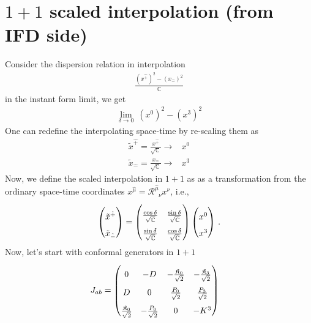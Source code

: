 \documentclass[]{article}
\numberwithin{equation}{section}
\begin{document}
{{\section{$1+1$ scaled interpolation (from IFD side)}\label{scaled_interpol_from_IFD}
Consider the dispersion relation in interpolation
\begin{align}
    \frac{(x^{\hat{+}})^{2}-(x_{\hat{-}})^{2}}{\mathbb{C}}
\end{align}
in the instant form limit, we get
\begin{align}
    \lim_{\delta\longrightarrow0}~(x^0)^2-(x^3)^2
\end{align}
One can redefine the interpolating space-time by re-scaling them as
\begin{align}
    \tilde{x}^{\hat{+}}=\frac{x^{\hat{+}}}{\sqrt{\mathbb{C}}}\longrightarrow &x^0\\
    \tilde{x}_{\hat{-}}=\frac{x_{\hat{-}}}{\sqrt{\mathbb{C}}}\longrightarrow &x^3
\end{align}
Now, we define the scaled interpolation in $1+1$ as as a transformation from the ordinary space-time coordinates $x^{\hat{\mu}}=\mathcal{R}^{\hat{\mu}}_{\phantom{\mu}{\nu}}x^{\nu}$, i.e.,
\begin{align}
  \begin{pmatrix}
   \rule{0pt}{16pt} \tilde{x}^{\hat{+}}\\
    \rule{0pt}{16pt} \tilde{x}_{\hat{-}}
  \end{pmatrix}=
  \begin{pmatrix}
    \rule{0pt}{16pt} \frac{\cos\delta}{\sqrt{\mathbb{C}}}  & \frac{\sin\delta}{\sqrt{\mathbb{C}}} \\
    \rule{0pt}{16pt} \frac{\sin\delta}{\sqrt{\mathbb{C}}}  & \frac{\cos\delta}{\sqrt{\mathbb{C}}}
  \end{pmatrix}
  \begin{pmatrix}
    \rule{0pt}{16pt} x^{0}\\
   \rule{0pt}{16pt} x^{3}
  \end{pmatrix}\,.
\end{align}
Now, let's start with conformal generators in $1+1$
\begin{align}
    J_{{a}{b}}&=\begin{pmatrix}
    \rule{0pt}{16pt} 0&-D&-\frac{\mathfrak{K}_{{0}}}{\sqrt{2}}&-\frac{\mathfrak{K}_{{3}}}{\sqrt{2}}\\
    \rule{0pt}{16pt} D&0&\frac{P_{{0}}}{\sqrt{2}}&\frac{P_{{3}}}{\sqrt{2}}\\
    \rule{0pt}{16pt} \frac{\mathfrak{K}_{{0}}}{\sqrt{2}}&-\frac{P_{{0}}}{\sqrt{2}}&0  & -K^3\\

\end{pmatrix}
\end{align}}}
\end{document}
